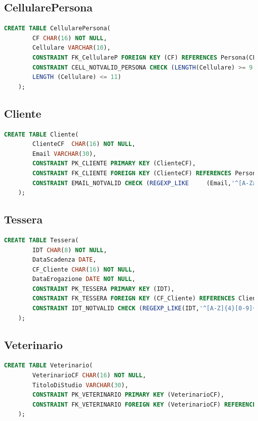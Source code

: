 \documentclass[12pt]{report}
\begin{document}
\subsection*{CellularePersona}
\begin{lstlisting}[language=SQL]
    CREATE TABLE CellularePersona(
        CF CHAR(16) NOT NULL,
        Cellulare VARCHAR(10),
        CONSTRAINT FK_CellulareP FOREIGN KEY (CF) REFERENCES Persona(CF),
        CONSTRAINT CELL_NOTVALID_PERSONA CHECK (LENGTH(Cellulare) >= 9 AND 
        LENGTH (Cellulare) <= 11)
    );   
\end{lstlisting}

\subsection*{Cliente}
\begin{lstlisting}[language=SQL]
    CREATE TABLE Cliente(
        ClienteCF  CHAR(16) NOT NULL,
        Email VARCHAR(30),
        CONSTRAINT PK_CLIENTE PRIMARY KEY (ClienteCF),
        CONSTRAINT FK_CLIENTE FOREIGN KEY (ClienteCF) REFERENCES Persona(CF),
        CONSTRAINT EMAIL_NOTVALID CHECK (REGEXP_LIKE     (Email,'^[A-Za-z0-9._%-]+@[A-Za-z0-9.-]+[.][A-Za-z]+$'))
    );
\end{lstlisting}

\subsection*{Tessera}
\begin{lstlisting}[language=SQL]
    CREATE TABLE Tessera(
        IDT CHAR(8) NOT NULL,
        DataScadenza DATE,
        CF_Cliente CHAR(16) NOT NULL, 
        DataErogazione DATE NOT NULL,
        CONSTRAINT PK_TESSERA PRIMARY KEY (IDT),
        CONSTRAINT FK_TESSERA FOREIGN KEY (CF_Cliente) REFERENCES Cliente(ClienteCF),
        CONSTRAINT IDT_NOTVALID CHECK (REGEXP_LIKE(IDT,'^[A-Z]{4}[0-9]{4}$'))
    );
\end{lstlisting}

\subsection*{Veterinario}
\begin{lstlisting}[language=SQL]
    CREATE TABLE Veterinario(
        VeterinarioCF CHAR(16) NOT NULL,
        TitoloDiStudio VARCHAR(30),
        CONSTRAINT PK_VETERINARIO PRIMARY KEY (VeterinarioCF),
        CONSTRAINT FK_VETERINARIO FOREIGN KEY (VeterinarioCF) REFERENCES Persona(CF)
    );
\end{lstlisting}
\end{document}
